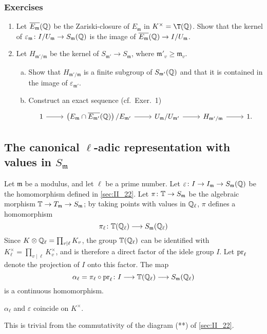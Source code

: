 \subsubsection*{Exercises}
\begin{enumerate}[1)]
\item Let $\overline{E_\mathfrak{m}}(\mathbb{Q})$ be the Zariski-closure of
	$E_\mathfrak{m}$ in $K^\times = \T(\Q)$. Show that the kernel of
	$\varepsilon_\mathfrak{m} \colon I/U_\mathfrak{m} \to
	S_\mathfrak{m}(\mathbb{Q})$ is the image of $\overline{E_\mathfrak{m}}(\mathbb{Q}) \to
	I/U_\mathfrak{m}$.
\item Let $H_{\mathfrak{m}'/\mathfrak{m}}$ be the kernel of
	\dpage
	$S_{\mathfrak{m}'} \to S_\mathfrak{m}$, where $\mathfrak{m}'_v \geq
	\mathfrak{m}_v$.
	\begin{enumerate}[a)]
	\item Show that $H_{\mathfrak{m}'/\mathfrak{m}}$ is a finite subgroup
		of $S_{\mathfrak{m}'}(\mathbb{Q})$ and that it is contained  in the
		image of $\varepsilon_{\mathfrak{m}'}$.
	\item Construct an exact sequence (cf.\ Exer.~1)
		\[\begin{tikzcd}
		1 \arrow[r] & \left({E_\mathfrak{m} \cap
		\algcl{E_{\mathfrak{m}'}}(\Q)}\right)/ E_{\mathfrak{m}'}
				\arrow[r] & U_\mathfrak{m} / U_{\mathfrak{m}'}
				\arrow[r] & H_{\mathfrak{m}'/\mathfrak{m}}
				\arrow[r] & 1.
		\end{tikzcd}\]
	\end{enumerate}	
\end{enumerate}

\subsection{The canonical \texorpdfstring{$\ell$}{ℓ}-adic representation with
values in \texorpdfstring{$S_{\mathfrak{m}}$}{Sm}}\label{sec:II_23}
Let $\mathfrak{m}$ be a modulus, and let $\ell$ be a prime number. Let
$\varepsilon\colon I \to I_{\mathfrak{m}} \to S_{\mathfrak{m}}(\mathbb{Q})$ be the
homomorphism defined in \ref{sec:II_22}. Let $\pi\colon \mathbb{T} \to S_{\mathfrak{m}}$
be the algebraic morphism $\mathbb{T} \to T_{\mathfrak{m}} \to S_{\mathfrak{m}}$; by
taking points with values in $\mathbb{Q}_\ell$, $\pi$ defines a homomorphism
\[
	\pi_\ell \colon \mathbb{T}(\mathbb{Q}_\ell) \longrightarrow S_{\mathfrak{m}}(\mathbb{Q}_\ell)
\]
Since $K \otimes \mathbb{Q}_\ell = \prod_{v\mid\ell} K_v$, the group $\mathbb{T}(\mathbb{Q}_\ell)$ can
be identified with $K_\ell^\times = \prod_{v\mid\ell} K_v^\times$, and is
therefore a direct factor of the idele group $I$.  Let $\operatorname{pr}_\ell$ denote the
projection of $I$ onto this factor. The map
\[
	\alpha_\ell = \pi_\ell \circ \operatorname{pr}_\ell \colon I \longrightarrow \mathbb{T}(\mathbb{Q}_\ell)
	\longrightarrow S_{\mathfrak{m}}(\mathbb{Q}_\ell)
\]
is a continuous homomorphism.
\begin{lem}
	$\alpha_\ell$ and $\varepsilon$ coincide on $K^\times$.
\end{lem}
This is trivial from the commutativity of the diagram (**) of \ref{sec:II_22}.


